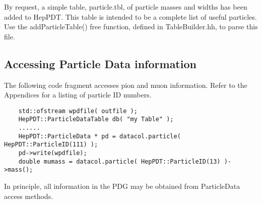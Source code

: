 By request, a simple table, particle.tbl, of particle masses and widths has 
been added to HepPDT.  This table is intended to be a complete list of useful
particles.   Use the addParticleTable() free function, defined in 
TableBuilder.hh, to parse this file.

\subsection { Accessing Particle Data information }

The following code fragment accesses pion and muon information.
Refer to the Appendices for a listing of particle ID numbers.
\begin{verbatim}
    std::ofstream wpdfile( outfile );
    HepPDT::ParticleDataTable db( "my Table" );
    ......
    HepPDT::ParticleData * pd = datacol.particle( HepPDT::ParticleID(111) );
    pd->write(wpdfile);
    double mumass = datacol.particle( HepPDT::ParticleID(13) )->mass();
\end{verbatim}

In principle, all information in the PDG may be obtained from ParticleData
access methods.

